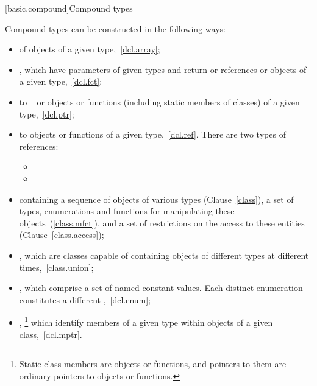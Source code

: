 [basic.compound]{Compound types}

\pnum
{}%
Compound types can be constructed in the following ways:
\begin{itemize}
\item {} of objects of a given type,~\ref{dcl.array};

\item {}, which have parameters of given types and return
 or references or objects of a given type,~\ref{dcl.fct};

\item {} to \cv{}~ or objects or functions (including
static members of classes) of a given type,~\ref{dcl.ptr};

\item %
%
%
 to objects or functions of a given
type,~\ref{dcl.ref}. There are two types of references:
\begin{itemize}
\item {}
\item {}
\end{itemize}

\item
{} containing a sequence of objects of various types
(Clause~\ref{class}), a set of types, enumerations and functions for
manipulating these objects~(\ref{class.mfct}), and a set of restrictions
on the access to these entities (Clause~\ref{class.access});

\item
{}, which are classes capable of containing objects of
different types at different times,~\ref{class.union};

\item
{}, which comprise a set of named constant values.
Each distinct enumeration constitutes a different
,~\ref{dcl.enum};

\item {}%
,%
\footnote{Static class members are objects or functions, and pointers to them are
ordinary pointers to objects or functions.}
which identify members of a given
type within objects of a given class,~\ref{dcl.mptr}.
\end{itemize}

